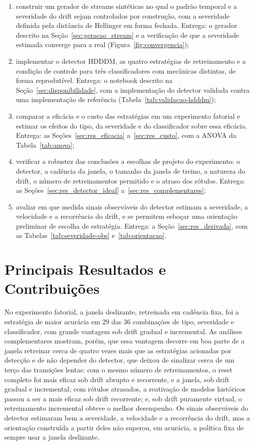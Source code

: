 \begin{enumerate}
  \item construir um gerador de streams sintéticas no qual o padrão temporal
  e a severidade do drift sejam controlados por construção, com a
  severidade definida pela distância de Hellinger em forma fechada.
  Entrega: o gerador descrito na Seção~\ref{sec:geracao_stream} e a
  verificação de que a severidade estimada converge para a real
  (Figura~\ref{fig:convergencia});
  \item implementar o detector HDDDM, as quatro estratégias de
  retreinamento e a condição de controle para três classificadores com
  mecânicas distintas, de forma reprodutível. Entrega: o notebook descrito
  na Seção~\ref{sec:disponibilidade}, com a implementação do detector
  validada contra uma implementação de referência
  (Tabela~\ref{tab:validacao-hdddm});
  \item comparar a eficácia e o custo das estratégias em um experimento
  fatorial e estimar os efeitos do tipo, da severidade e do classificador
  sobre essa eficácia. Entrega: as Seções~\ref{sec:res_eficacia}
  a~\ref{sec:res_custo}, com a ANOVA da Tabela~\ref{tab:anova};
  \item verificar a robustez das conclusões a escolhas de projeto do
  experimento: o detector, a cadência da janela, o tamanho da janela de
  treino, a natureza do drift, o número de retreinamentos permitido e o
  atraso dos rótulos. Entrega: as Seções~\ref{sec:res_detector_ideal}
  a~\ref{sec:res_complementares};
  \item avaliar em que medida sinais observáveis do detector estimam a
  severidade, a velocidade e a recorrência do drift, e se permitem esboçar
  uma orientação preliminar de escolha de estratégia. Entrega: a
  Seção~\ref{sec:res_derivada}, com as
  Tabelas~\ref{tab:severidade-obs} e~\ref{tab:orientacao}.
\end{enumerate}

\section*{Principais Resultados e Contribuições}

No experimento fatorial, a janela deslizante, retreinada em cadência fixa,
foi a estratégia de maior acurácia em 29 das 36 combinações de tipo,
severidade e classificador, com grande vantagem sob drift gradual e
incremental. As análises complementares mostram, porém, que essa vantagem
decorre em boa parte de a janela retreinar cerca de quatro vezes mais que as
estratégias acionadas por detecção e de não depender do detector, que deixou
de sinalizar cerca de um terço das transições lentas: com o mesmo número de
retreinamentos, o reset completo foi mais eficaz sob drift abrupto e
recorrente, e a janela, sob drift gradual e incremental; com rótulos
atrasados, a reativação de modelos históricos passou a ser a mais eficaz sob
drift recorrente; e, sob drift puramente virtual, o retreinamento
incremental obteve o melhor desempenho. Os sinais observáveis do detector
estimaram bem a severidade, a velocidade e a recorrência do drift, mas a
orientação construída a partir deles não superou, em acurácia, a política
fixa de sempre usar a janela deslizante.

